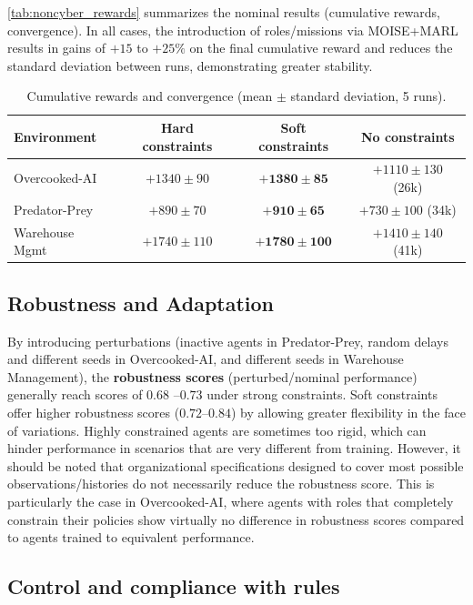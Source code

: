 \autoref{tab:noncyber_rewards} summarizes the nominal results (cumulative rewards, convergence).
In all cases, the introduction of roles/missions via MOISE+MARL results in gains of $+15$ to $+25\%$ on the final cumulative reward and reduces the standard deviation between runs, demonstrating greater stability.

\begin{table}[h!]
  \centering
  \caption{Cumulative rewards and convergence (mean $\pm$ standard deviation, 5 runs).}
  \label{tab:noncyber_rewards}
  \renewcommand{\arraystretch}{1.2}
  \small
  \begin {tabular}{lccc}
  \hline
  \textbf{Environment} & \textbf{Hard constraints} & \textbf{Soft constraints} & \textbf{No constraints} \\
  \hline
  Overcooked-AI & $+1340 \pm 90$ & $\mathbf{+1380 \pm 85} $ & $+1110 \pm 130$ (26k) \\
  Predator-Prey & $+890 \pm 70$ & $\mathbf{+910 \pm 65}$ & $+730 \pm 100$ (34k) \\
  Warehouse Mgmt & $+1740 \pm 110$ & $\mathbf{+1780 \pm 100}$ & $+1410 \pm 140$ (41k) \\
  \hline
  \end{tabular}
\end{table}

\subsection*{Robustness and Adaptation}

By introducing perturbations (inactive agents in Predator-Prey, random delays and different seeds in Overcooked-AI, and different seeds in Warehouse Management), the \textbf{robustness scores} (perturbed/nominal performance) generally reach scores of $0.68$ –$0.73$ under strong constraints.
Soft constraints offer higher robustness scores ($0.72$–$0.84$) by allowing greater flexibility in the face of variations. Highly constrained agents are sometimes too rigid, which can hinder performance in scenarios that are very different from training.
However, it should be noted that organizational specifications designed to cover most possible observations/histories do not necessarily reduce the robustness score. This is particularly the case in Overcooked-AI, where agents with roles that completely constrain their policies show virtually no difference in robustness scores compared to agents trained to equivalent performance.

\subsection*{Control and compliance with rules}

